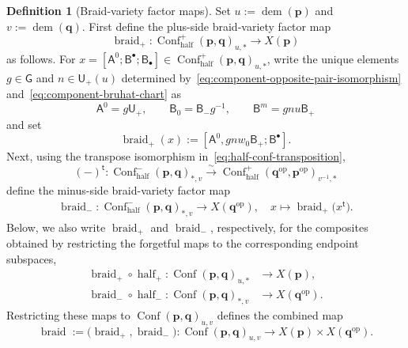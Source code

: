 \documentclass[10pt,a4paper]{article}
\theoremstyle{definition}
\newtheorem{definition}[theorem]{Definition}
\theoremstyle{remark}
\newcommand{\flagA}{\mathsf{A}}
\newcommand{\flagB}{\mathsf{B}}
\newcommand{\groupG}{\mathsf{G}}
\newcommand{\borelB}{\mathsf{B}}
\newcommand{\unipotentU}{\mathsf{U}}
\newcommand{\Conf}{\operatorname{Conf}}
\newcommand{\Confhalf}{\operatorname{Conf}_{\mathrm{half}}}
\begin{document}
\begin{definition}[Braid-variety factor maps]
\label{def:double-braid-factors}
Set \(u:=\operatorname{dem}(\mathbf p)\) and
\(v:=\operatorname{dem}(\mathbf q)\).  First define the plus-side
braid-variety factor map
\[
 \operatorname{braid}_+:
 \Confhalf^+(\mathbf p,\mathbf q)_{u,*}
 \longrightarrow X(\mathbf p)
\]
as follows.  For
\(x=[\flagA^0;\flagB^\bullet;\flagB_\bullet]
\in\Confhalf^+(\mathbf p,\mathbf q)_{u,*}\), write the unique elements
\(g\in\groupG\) and \(n\in\unipotentU_+(u)\) determined
by~\eqref{eq:component-opposite-pair-isomorphism}
and~\eqref{eq:component-bruhat-chart} as
\[
 \flagA^0=g \unipotentU_+,
 \qquad
 \flagB_0=\borelB_-g^{-1},
 \qquad
 \flagB^m=g n u\borelB_+
\]
and set
\begin{equation}
 \operatorname{braid}_+(x)
 :=[\flagA^0,g n w_0\borelB_+;\flagB^\bullet].
 \label{eq:braid-plus-definition}
\end{equation}
Next, using the transpose isomorphism in~\eqref{eq:half-conf-transposition},
\[
 (-)^{\mathsf t}:
 \Confhalf^-(\mathbf p,\mathbf q)_{*,v}
 \xrightarrow{\sim}
 \Confhalf^+(\mathbf q^{\mathrm{op}},
             \mathbf p^{\mathrm{op}})_{v^{-1},*}
\]
define the minus-side braid-variety factor map
\begin{equation}
 \begin{aligned}
 \operatorname{braid}_-:
 \Confhalf^-(\mathbf p,\mathbf q)_{*,v}
 \longrightarrow X(\mathbf q^{\mathrm{op}}),\quad
 x\longmapsto
 \operatorname{braid}_+
 \bigl(x^{\mathsf t}\bigr).
 \end{aligned}
 \label{eq:braid-minus-definition}
\end{equation}
Below, we also write \(\operatorname{braid}_+\) and
\(\operatorname{braid}_-\), respectively, for the composites obtained by
restricting the forgetful maps to the corresponding endpoint subspaces,
\[
\begin{aligned}
 \operatorname{braid}_+\circ\operatorname{half}_+:
 \Conf(\mathbf p,\mathbf q)_{u,*}
 &\longrightarrow X(\mathbf p),\\
 \operatorname{braid}_-\circ\operatorname{half}_-:
  \Conf(\mathbf p,\mathbf q)_{*,v}
  &\longrightarrow X(\mathbf q^{\mathrm{op}}).
\end{aligned}
\]
Restricting these maps to \(\Conf(\mathbf p,\mathbf q)_{u,v}\) defines the
combined map
\begin{equation}
 \operatorname{braid}
 :=\bigl(\operatorname{braid}_+,\operatorname{braid}_-\bigr):
 \Conf(\mathbf p,\mathbf q)_{u,v}
 \longrightarrow
 X(\mathbf p)\times X(\mathbf q^{\mathrm{op}}).
 \label{eq:double-braid-factor-map}
\end{equation}
\end{definition}
\end{document}
